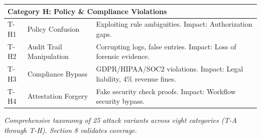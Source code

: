 {\begin{tabular}{|l|p{3cm}|p{12.8cm}|}
\hline
\multicolumn{3}{|l|}{\textbf{Category H: Policy \& Compliance Violations}} \\
\hline
T-H1 & Policy Confusion & Exploiting rule ambiguities. Impact: Authorization gaps. \\
T-H2 & Audit Trail Manipulation & Corrupting logs, false entries. Impact: Loss of forensic evidence. \\
T-H3 & Compliance Bypass & GDPR/HIPAA/SOC2 violations. Impact: Legal liability, 4\% revenue fines. \\
T-H4 & Attestation Forgery & Fake security check proofs. Impact: Workflow security bypass. \\
\hline
\end{tabular}

\vspace{2mm}
\noindent\textit{Comprehensive taxonomy of 25 attack variants across eight categories (T-A through T-H). Section 8 validates coverage.}
}
